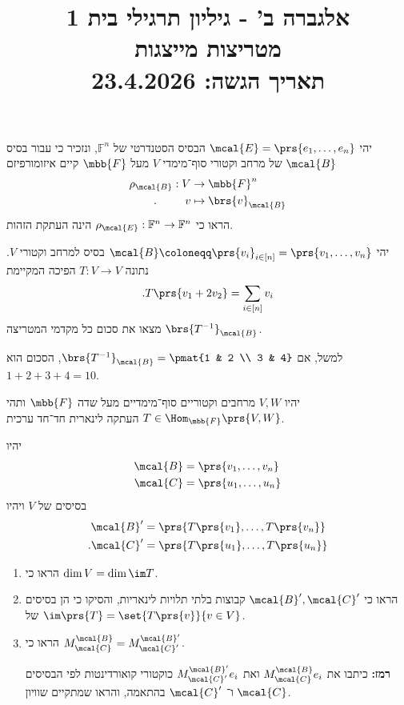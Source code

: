 \documentclass[a4paper,10pt,twoside,openany]{article}
\title{
אלגברה ב' - גיליון תרגילי בית 1 \\
מטריצות מייצגות
\\
\vspace{1cm}
\large{תאריך הגשה: 23.4.2026}
}
\date{}
\begin{document}
\maketitle

\begin{exercise}
יהי
$\mcal{E} = \prs{e_1, \ldots, e_n}$
הבסיס הסטנדרטי של
$\mathbb{F}^n$,
ונזכיר כי עבור בסיס
$\mcal{B}$
של מרחב וקטורי סוף־מימדי
$V$
מעל
$\mbb{F}$
קיים איזומורפיזם
\begin{align*}
\rho_\mcal{B} : V &\to \mbb{F}^n \\
\text{.} \hphantom{lalala} v &\mapsto \brs{v}_\mcal{B}
\end{align*}
הראו כי
$\rho_{\mcal{E}} : \mathbb{F}^n \to \mathbb{F}^n$
הינה העתקת הזהות.
\end{exercise}

\begin{exercise}
יהי
$\mcal{B} \coloneqq \prs{v_i}_{i \in [n]} = \prs{v_1, \ldots, v_n}$
בסיס למרחב וקטורי
$V$.
נתונה
$T \colon V \to V$
הפיכה המקיימת
\[\text{.} T\prs{v_1 + 2 v_2} = \sum_{i \in [n]} v_i\]
מצאו את סכום כל מקדמי המטריצה
$\brs{T^{-1}}_{\mcal{B}}$.

למשל, אם
$\brs{T^{-1}}_{\mcal{B}} = \pmat{1 & 2 \\ 3 & 4}$,
הסכום הוא
$1+2+3+4 = 10$.
\end{exercise}

\begin{exercise}
יהיו
$V,W$
מרחבים וקטוריים סוף־מימדיים מעל שדה
$\mbb{F}$
ותהי
$T \in \Hom_{\mbb{F}}\prs{V,W}$
העתקה לינארית חד־חד ערכית.

יהיו
\begin{align*}
\mcal{B} &= \prs{v_1, \ldots, v_n} \\
\mcal{C} &= \prs{u_1, \ldots, u_n}
\end{align*}
בסיסים של
$V$
ויהיו
\begin{align*}
\mcal{B}' &= \prs{T\prs{v_1}, \ldots, T\prs{v_n}} \\
\text{.} \mcal{C}' &= \prs{T\prs{u_1}, \ldots, T\prs{u_n}}
\end{align*}

\begin{enumerate}
\item
הראו כי
$\dim V = \dim \im T$.

\item הראו כי
$\mcal{B}', \mcal{C}'$
קבוצות בלתי תלויות לינאריות, והסיקו כי הן בסיסים של
$\im\prs{T} = \set{T\prs{v}}{v \in V}$.

\item
הראו כי
$M^\mcal{B}_\mcal{C} = M^{\mcal{B}'}_{\mcal{C}'}$.

\textbf{רמז:}
כיתבו את
$M^\mcal{B}_\mcal{C} e_i$
ואת
$M^{\mcal{B}'}_{\mcal{C}'} e_i$
כוקטורי קואורדינטות לפי הבסיסים
$\mcal{C}$
ו־%
$\mcal{C}'$
בהתאמה, והראו שמתקיים שוויון.
\end{enumerate}
\end{exercise}
\end{document}
